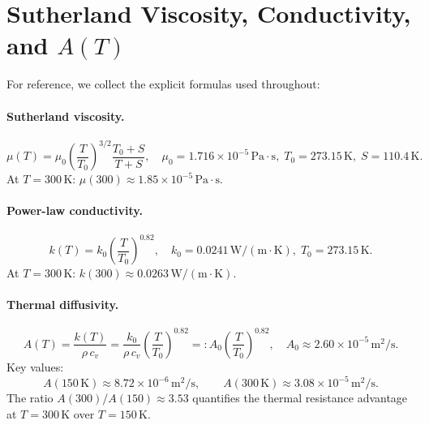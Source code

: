 \documentclass[12pt]{article}
\begin{document}
\appendix

\section{Sutherland Viscosity, Conductivity, and $A(T)$}
\label{app:sutherland}

For reference, we collect the explicit formulas used throughout:

\paragraph{Sutherland viscosity.}
\begin{equation}
  \mu(T) = \mu_0\left(\frac{T}{T_0}\right)^{3/2}\frac{T_0+S}{T+S},
  \quad \mu_0 = 1.716\times10^{-5}\,\mathrm{Pa\cdot s},\;
  T_0 = 273.15\,\mathrm{K},\; S = 110.4\,\mathrm{K}.
\end{equation}
At $T = 300\,\mathrm{K}$: $\mu(300) \approx 1.85\times10^{-5}\,\mathrm{Pa\cdot s}$.

\paragraph{Power-law conductivity.}
\begin{equation}
  k(T) = k_0\left(\frac{T}{T_0}\right)^{0.82},
  \quad k_0 = 0.0241\,\mathrm{W/(m\cdot K)},\; T_0 = 273.15\,\mathrm{K}.
\end{equation}
At $T = 300\,\mathrm{K}$: $k(300) \approx 0.0263\,\mathrm{W/(m\cdot K)}$.

\paragraph{Thermal diffusivity.}
\begin{equation}
  A(T) = \frac{k(T)}{\rho\,c_v}
       = \frac{k_0}{\rho\,c_v}\left(\frac{T}{T_0}\right)^{0.82}
       =: A_0\left(\frac{T}{T_0}\right)^{0.82},
  \quad A_0 \approx 2.60\times10^{-5}\,\mathrm{m}^2/\mathrm{s}.
\end{equation}
Key values:
\begin{equation}
  A(150\,\mathrm{K}) \approx 8.72\times10^{-6}\,\mathrm{m}^2/\mathrm{s},
  \qquad
  A(300\,\mathrm{K}) \approx 3.08\times10^{-5}\,\mathrm{m}^2/\mathrm{s}.
\end{equation}
The ratio $A(300)/A(150) \approx 3.53$ quantifies the thermal resistance advantage
at $T = 300\,\mathrm{K}$ over $T = 150\,\mathrm{K}$.
\end{document}
